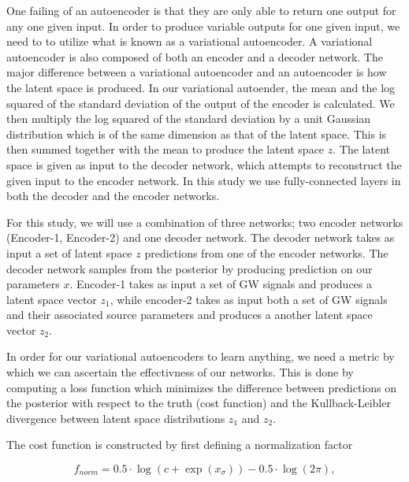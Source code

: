 \documentclass{nature}
\begin{document}
%
%
One failing of an autoencoder is that they are only able to return one 
output for any one given input. In order to produce variable outputs for 
one given input, we need to to utilize what is known as a variational autoencoder.
A variational autoencoder is also composed of both an encoder and a decoder network. 
The major difference between a variational autoencoder and an autoencoder is how the 
latent space is produced. In our variational autoender, the mean and the log squared 
of the standard deviation of the output of the encoder is calculated. We then multiply 
the log squared of the standard deviation by a unit Gaussian distribution which is 
of the same dimension as that of the latent space. This is then summed together 
with the mean to produce the latent space $z$. The latent space is given as input 
to the decoder network, which attempts to reconstruct the given input to 
the encoder network. In this study we use fully-connected layers in 
both the decoder and the encoder networks.

%
%
For this study, we will use a combination of three networks; two encoder networks (Encoder-1, Encoder-2) 
and one decoder network. The decoder network takes as input a set of latent space 
$z$ predictions from one of the encoder networks. The decoder network samples from 
the posterior by producing prediction on our parameters $x$. Encoder-1 takes as 
input a set of GW signals and produces a latent space vector $z_1$, while encoder-2 
takes as input both a set of GW signals and their associated source parameters 
and produces a another latent space vector $z_2$.


%
%
In order for our variational autoencoders to learn anything, we need a metric by which 
we can ascertain the effectivness of our networks. This is done by computing 
a loss function which minimizes the difference 
between predictions on the posterior with respect to the truth (cost function) and the Kullback-Leibler divergence 
between latent space distributions $z_1$ and $z_2$. 

%
%
The cost function is constructed by first defining a normalization factor

\begin{equation}
    f_{norm} = 0.5 \cdot \log(c + \exp(x_{\sigma})) - 0.5 \cdot \log(2\pi),
\end{equation}
\end{document}
